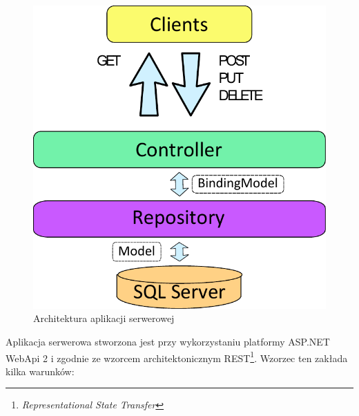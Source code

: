 \documentclass{book}
\begin{document}
			\begin{figure}
				\centering
				\includegraphics[width=1\textwidth]{images/architektura_server.pdf}
				\caption{Architektura aplikacji serwerowej}
				\label{fig:architektura_server}
			\end{figure}
			
			Aplikacja serwerowa stworzona jest przy wykorzystaniu platformy ASP.NET WebApi 2 i zgodnie ze wzorcem architektonicznym REST\footnote{\emph{Representational State Transfer}}. Wzorzec ten zakłada kilka warunków:
			
\end{document}
